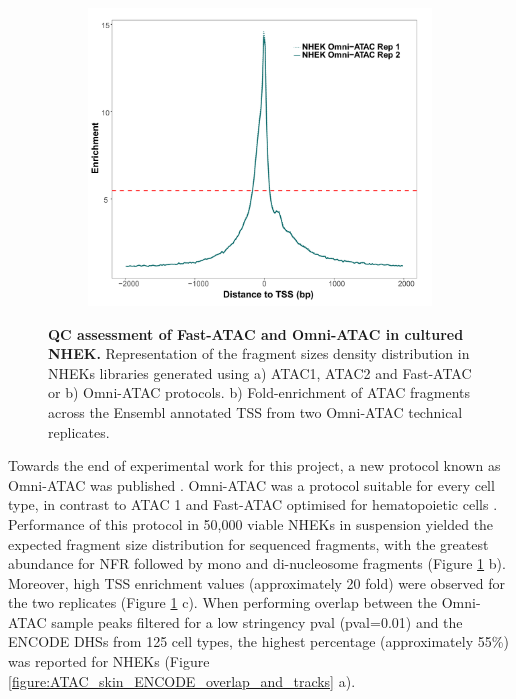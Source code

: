 \begin{figure}[htbp]
\begin{subfigure}{0.48\textwidth}
\end{subfigure}
\begin{subfigure}{0.5\textwidth}
\centering
\includegraphics[width=\textwidth]{./Results1/pdfs/ATAC_skin_TSS_enrichment_NHEK_omni_ATAC}
\caption{\textbf{}} %
\end{subfigure}%
\caption[QC assessment of Fast-ATAC and Omni-ATAC in cultured NHEK]{\textbf{QC assessment of Fast-ATAC and Omni-ATAC in cultured NHEK.
} Representation of the fragment sizes density distribution in NHEKs libraries generated using a) ATAC1, ATAC2 and Fast-ATAC or b) Omni-ATAC protocols. b) Fold-enrichment of ATAC fragments across the Ensembl annotated TSS from two Omni-ATAC technical replicates.}
\label{figure:PS02_skin_ATAC_QC_assessment}
\end{figure} 


Towards the end of experimental work for this project, a new protocol known as Omni-ATAC was published \parencite{Corces2017}. Omni-ATAC was a protocol suitable for every cell type, in contrast to ATAC 1 and Fast-ATAC optimised for hematopoietic cells \parencite{Buenrostro2013,Corces2016}. Performance of this protocol in 50,000 viable NHEKs in suspension yielded the expected fragment size distribution for sequenced fragments, with the greatest abundance for NFR followed by mono and di-nucleosome fragments (Figure \ref{figure:PS02_skin_ATAC_QC_assessment} b). Moreover, high TSS enrichment values (approximately 20 fold) were observed for the two replicates (Figure \ref{figure:PS02_skin_ATAC_QC_assessment} c). When performing overlap between the Omni-ATAC sample peaks filtered for a low stringency pval (pval=0.01) and the ENCODE DHSs from 125 cell types, the highest percentage (approximately 55\%) was reported for NHEKs (Figure \ref{figure:ATAC_skin_ENCODE_overlap_and_tracks} a).


